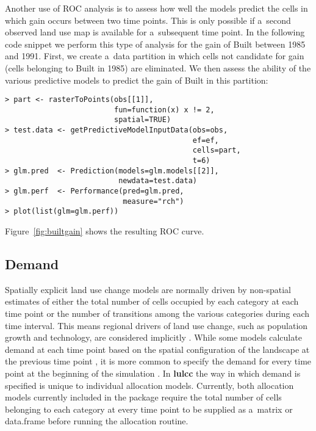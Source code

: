 \documentclass{icldt}\usepackage[]{graphicx}\usepackage[]{color}
\begin{document}
Another use of ROC analysis is to assess how well the models predict the cells in which gain occurs between two time points. This is only possible if a~second observed land use map is available for a~subsequent time point. In the following code snippet we perform this type of analysis for the gain of Built between 1985 and 1991. First, we create a~data partition in which cells not candidate for gain (cells belonging to Built in 1985) are eliminated. We then assess the ability of the various predictive models to predict the gain of Built in this partition:
\begin{verbatim}
> part <- rasterToPoints(obs[[1]], 
                         fun=function(x) x != 2, 
                         spatial=TRUE) 
> test.data <- getPredictiveModelInputData(obs=obs, 
                                           ef=ef, 
                                           cells=part, 
                                           t=6) 
> glm.pred  <- Prediction(models=glm.models[[2]], 
                          newdata=test.data) 
> glm.perf  <- Performance(pred=glm.pred, 
                           measure="rch") 
> plot(list(glm=glm.perf))
\end{verbatim}
\noindent Figure~\ref{fig:builtgain} shows the resulting ROC curve. \\

\subsection{Demand}

Spatially explicit land use change models are normally driven by non-spatial estimates of either the total number of cells occupied by each category at each time point or the number of transitions among the various categories during each time interval. This means regional drivers of land use change, such as population growth and technology, are considered implicitly \citep{fuchs2013}. While some models calculate demand at each time point based on the spatial configuration of the landscape at the previous time point \citep[e.g.][]{rosa2013}, it is more common to specify the demand for every time point at the beginning of the simulation \citep[e.g.][]{pontius2001,verburg2002,sohl2007}. In \textbf{lulcc} the way in which demand is specified is unique to individual allocation models. Currently, both allocation models currently included in the package require the total number of cells belonging to each category at every time point to be supplied as a~matrix or data.frame before running the allocation routine. \\
\end{document}

